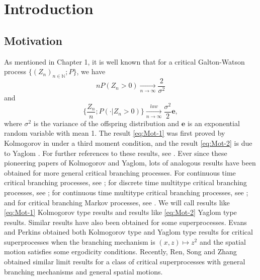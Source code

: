 \documentclass[UTF8]{pkuthss}
\theoremstyle{plain}
\theoremstyle{definition}
\numberwithin{equation}{section}
\begin{document}
\section{Introduction}
\subsection{Motivation}
\label{sec: Motivation}
	As mentioned in Chapter 1, it is well known that for a critical Galton-Watson process $\{(Z_n)_{n\in \mathbb N};P\}$, we have
\begin{equation}
\label{eq:Mot-1}
	nP(Z_n>0)
	\xrightarrow[n\to\infty]{} \frac{2}{\sigma^2}
\end{equation}
	and
\begin{equation}
\label{eq:Mot-2}
	\Big\{\frac{Z_n}{n}; P(\cdot|Z_n>0)\Big\}
	\xrightarrow[n\to\infty]{law} \frac{\sigma^2}{2} \mathbf e,
\end{equation}
	where $\sigma^2$ is the variance of the offspring distribution and $\mathbf e$ is an exponential random variable with mean 1.
	The result \eqref{eq:Mot-1} was first proved by Kolmogorov in \cite{Kolmogorov1938Zur-losung} under a third moment condition, and the result \eqref{eq:Mot-2} is due to Yaglom \cite{Yaglom1947Certain}.
	For further references to these results, see \cite{Harris2002The-theory, KestenNeySpitzer1966The-Galton-Watson}.
	Ever since these pioneering papers of Kolmogorov and Yaglom, lots of analogous results
	have been obtained for more general critical branching processes.
	For continuous time critical branching processes, see \cite{AthreyaNey1972Branching}; for discrete time multitype critical branching processes, see \cite{AthreyaNey1972Branching, JoffeSpitzer1967On-multitype}; for continuous time multitype critical branching processes, see \cite{AthreyaNey1974Functionals}; and for critical branching Markov processes, see \cite{AsmussenHering1983Branching}.
	We will call results like \eqref{eq:Mot-1} Kolmogorov type results and results like \eqref{eq:Mot-2} Yaglom type results.
	Similar results have also been obtained for some superprocesses.
	Evans and Perkins \cite{EvansPerkins1990Measure-valued} obtained both Kolmogorov type and Yaglom type results for critical superprocesses when the branching mechanism is $(x,z) \mapsto z^2$ and the spatial motion satisfies some ergodicity conditions.
	Recently, Ren, Song and Zhang \cite{RenSongZhang2015Limit} obtained similar limit results for a class of critical superprocesses with general branching mechanisms and general spatial motions.
\end{document}

